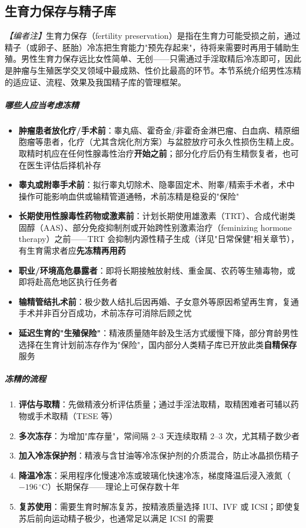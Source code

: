 \subsection{生育力保存与精子库}

\noindent\textit{【编者注】}生育力保存（fertility preservation）是指在生育力可能受损之前，通过精子（或卵子、胚胎）冷冻把生育能力"预先存起来"，待将来需要时再用于辅助生殖。男性生育力保存远比女性简单、无创——只需通过手淫取精后冷冻即可，因此是肿瘤与生殖医学交叉领域中最成熟、性价比最高的环节。本节系统介绍男性冻精的适应证、流程、效果及我国精子库的管理框架。

\subparagraph{哪些人应当考虑冻精}

\begin{itemize}
	\item \textbf{肿瘤患者放化疗/手术前}：睾丸癌、霍奇金/非霍奇金淋巴瘤、白血病、精原细胞瘤等患者，化疗（尤其含烷化剂方案）与盆腔放疗可永久性损伤生精上皮。取精时机应在任何性腺毒性治疗\textbf{开始之前}；部分化疗后仍有生精恢复者，也可在医生评估后择机补存
	\item \textbf{睾丸或附睾手术前}：拟行睾丸切除术、隐睾固定术、附睾/精索手术者，术中操作可能影响血供或输精管道通畅，术前冻精是稳妥的"保险"
	\item \textbf{长期使用性腺毒性药物或激素前}：计划长期使用雄激素（TRT）、合成代谢类固醇（AAS）、部分免疫抑制剂或开始跨性别激素治疗（feminizing hormone therapy）之前——TRT 会抑制内源性精子生成（详见"日常保健"相关章节），有生育需求者应\textbf{先冻精再用药}
	\item \textbf{职业/环境高危暴露者}：即将长期接触放射线、重金属、农药等生殖毒物，或即将赴高危地区执行任务者
	\item \textbf{输精管结扎术前}：极少数人结扎后因再婚、子女意外等原因希望再生育，复通手术并非百分百成功，术前冻存可消除后顾之忧
	\item \textbf{延迟生育的"生殖保险"}：精液质量随年龄及生活方式缓慢下降，部分育龄男性选择在生育计划前冻存作为"保险"，国内部分人类精子库已开放此类\textbf{自精保存}服务
\end{itemize}

\subparagraph{冻精的流程}

\begin{enumerate}
	\item \textbf{评估与取精}：先做精液分析评估质量；通过手淫法取精，取精困难者可辅以药物或手术取精（TESE 等）
	\item \textbf{多次冻存}：为增加"库存量"，常间隔 $2$--$3$ 天连续取精 $2$--$3$ 次，尤其精子数少者
	\item \textbf{加入冷冻保护剂}：精液与含甘油等冷冻保护剂的介质混合，防止冰晶损伤精子
	\item \textbf{降温冷冻}：采用程序化慢速冷冻或玻璃化快速冷冻，梯度降温后浸入液氮（$-196\,^{\circ}\mathrm{C}$）长期保存——理论上可保存数十年
	\item \textbf{复苏使用}：需要生育时解冻复苏，按精液质量选择 IUI、IVF 或 ICSI；即使复苏后前向运动精子极少，也通常足以满足 ICSI 的需要
\end{enumerate}

